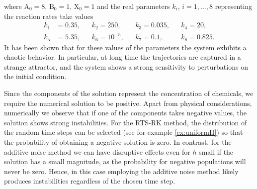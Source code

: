 \documentclass[10pt]{article}
\begin{document}
where $\mathrm{A}_0 = 8$, $\mathrm{B}_0 = 1$, $\mathrm{X}_0 = 1$ and the real parameters $k_i$, $i = 1, \ldots, 8$ representing the reaction rates take values
\begin{equation}
\begin{aligned}
k_1 &= 0.35, &&k_2 = 250, &&k_3 = 0.035, &&k_4 = 20,\\
k_5 &= 5.35, &&k_6 = 10^{-5}, &&k_7 = 0.1, &&k_8 = 0.825.
\end{aligned}
\end{equation}            
It has been shown \cite{Ols83} that for these values of the parameters the system exhibits a chaotic behavior. In particular, at long time the trajectories are captured in a strange attractor, and the system shows a strong sensitivity to perturbations on the initial condition. 

Since the components of the solution represent the concentration of chemicals, we require the numerical solution to be positive. Apart from physical considerations, numerically we observe that if one of the components takes negative values, the solution shows strong instabilities. For the RTS-RK method, the distribution of the random time steps can be selected (see for example \cref{ex:uniformH}) so that the probability of obtaining a negative solution is zero. In contrast, for the additive noise method we can have disruptive effects even for $h$ small if the solution has a small magnitude, as the probability for negative populations will never be zero. Hence, in this case employing the additive noise method likely produces instabilities regardless of the chosen time step.
\end{document}
